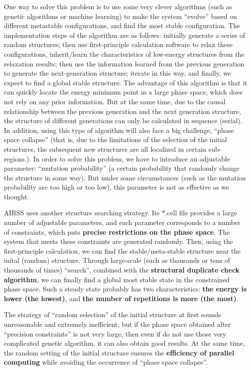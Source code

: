 \documentclass[a4paper, 10pt]{article}
\begin{document}
One way to solve this problem is to use some very clever algorithms (such as genetic algorithms or machine learning) to make the system ``evolve'' based on different metastable configurations, and find the most stable configuration. The implementation steps of the algorithm are as follows: initially generate a series of random structures; then use first-principle calculation software to relax these configurations, inherit/learn the characteristics of low-energy structures from the relaxation results; then use the information learned from the previous generation to generate the next-generation structure; iterate in this way, and finally, we expect to find a global stable structure. The advantage of this algorithm is that it can quickly locate the energy minimum point in a large phase space, which does not rely on any prior information.  But at the same time, due to the causal relationship between the previous generation and the next generation structure, the structure of different generations can only be calculated in sequence (serial). In addition, using this type of algorithm will also face a big challenge, ``phase space collapse'' (that is, due to the limitations of the selection of the initial structures, the subsequent new structures are all localized in certain sub-regions.). In order to solve this problem, we have to introduce an adjustable parameter: ``mutation probability'' (a certain probability that randomly change the structure in some way). But under some circumstances (such as the mutation probability are too high or too low), this parameter is not as effective as we thought.

AIRSS uses another structure searching strategy. Its *.cell file provides a large number of adjustable parameters, and each parameter corresponds to a number of constraints, which puts \textbf{precise restrictions on the phase space}. The system that meets these constraints are generated randomly. Then, using the first-principle calculation, we can find the stable/meta-stable structure near the inital (random) structure. Through large-scale (such as thousands or tens of thousands of times) ``search'', combined with the \textbf{structural duplicate check algorithm}, we can finally find a global most stable state in the constrained phase space. Such a steady state probably has two characteristics: \textbf{the energy is lower (the lowest)}, and \textbf{the number of repetitions is more (the most)}.

The strategy of ``random selection'' of the initial structure at first sounds unreasonable and extremely inefficient, but if the phase space obtained after ``precision constraints'' is not very large, then even if do not use those very complicated genetic algorithm, it can also obtain good results. At the same time, the random setting of the initial structure ensures the \textbf{efficiency of parallel computing} while avoiding the occurrence of ``phase space collapse''.
\end{document}
